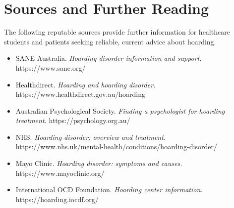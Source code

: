 \section*{Sources and Further Reading}
The following reputable sources provide further information for healthcare students and patients seeking reliable, current advice about hoarding.

\begin{itemize}
    \item SANE Australia. \textit{Hoarding disorder information and support.} https://www.sane.org/
    \item Healthdirect. \textit{Hoarding and hoarding disorder.} https://www.healthdirect.gov.au/hoarding
    \item Australian Psychological Society. \textit{Finding a psychologist for hoarding treatment.} https://psychology.org.au/
    \item NHS. \textit{Hoarding disorder: overview and treatment.} https://www.nhs.uk/mental-health/conditions/hoarding-disorder/
    \item Mayo Clinic. \textit{Hoarding disorder: symptoms and causes.} https://www.mayoclinic.org/
    \item International OCD Foundation. \textit{Hoarding center information.} https://hoarding.iocdf.org/
\end{itemize}
